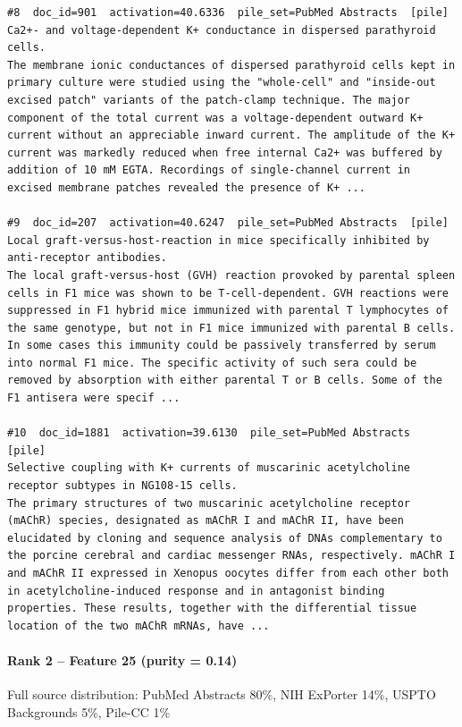 \begin{verbatim}
#8  doc_id=901  activation=40.6336  pile_set=PubMed Abstracts  [pile]
Ca2+- and voltage-dependent K+ conductance in dispersed parathyroid cells.
The membrane ionic conductances of dispersed parathyroid cells kept in primary culture were studied using the "whole-cell" and "inside-out excised patch" variants of the patch-clamp technique. The major component of the total current was a voltage-dependent outward K+ current without an appreciable inward current. The amplitude of the K+ current was markedly reduced when free internal Ca2+ was buffered by addition of 10 mM EGTA. Recordings of single-channel current in excised membrane patches revealed the presence of K+ ...

#9  doc_id=207  activation=40.6247  pile_set=PubMed Abstracts  [pile]
Local graft-versus-host-reaction in mice specifically inhibited by anti-receptor antibodies.
The local graft-versus-host (GVH) reaction provoked by parental spleen cells in F1 mice was shown to be T-cell-dependent. GVH reactions were suppressed in F1 hybrid mice immunized with parental T lymphocytes of the same genotype, but not in F1 mice immunized with parental B cells. In some cases this immunity could be passively transferred by serum into normal F1 mice. The specific activity of such sera could be removed by absorption with either parental T or B cells. Some of the F1 antisera were specif ...

#10  doc_id=1881  activation=39.6130  pile_set=PubMed Abstracts  [pile]
Selective coupling with K+ currents of muscarinic acetylcholine receptor subtypes in NG108-15 cells.
The primary structures of two muscarinic acetylcholine receptor (mAChR) species, designated as mAChR I and mAChR II, have been elucidated by cloning and sequence analysis of DNAs complementary to the porcine cerebral and cardiac messenger RNAs, respectively. mAChR I and mAChR II expressed in Xenopus oocytes differ from each other both in acetylcholine-induced response and in antagonist binding properties. These results, together with the differential tissue location of the two mAChR mRNAs, have ...

\end{verbatim}

\paragraph*{Rank 2 -- Feature 25 (purity = 0.14)}

Full source distribution: PubMed Abstracts 80\%, NIH ExPorter 14\%, USPTO Backgrounds 5\%, Pile-CC 1\%

